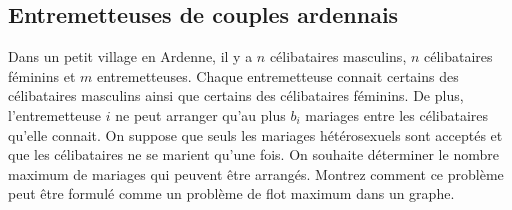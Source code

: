 \subsection{Entremetteuses de couples ardennais}
Dans un petit village en Ardenne, il y a $n$ célibataires masculins, $n$ célibataires féminins et $m$ entremetteuses. Chaque entremetteuse connait certains des célibataires masculins ainsi que certains des célibataires féminins. De plus, l'entremetteuse $i$ ne peut arranger qu'au plus $b_i$ mariages entre les célibataires qu'elle connait. On suppose que seuls les mariages hétérosexuels sont acceptés et que les célibataires ne se marient qu'une fois. On souhaite déterminer le nombre maximum de mariages qui peuvent être arrangés. Montrez comment ce problème peut être formulé comme un problème de flot maximum dans un graphe.

